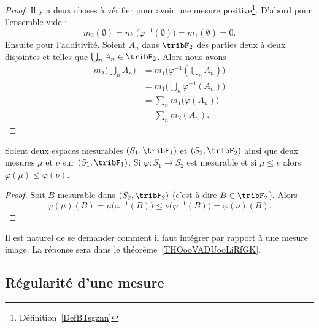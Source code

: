 \begin{proof}
	Il y a deux choses à vérifier pour avoir une mesure positive\footnote{Définition~\ref{DefBTsgznn}}. D'abord pour l'ensemble vide :
	\begin{equation}
		m_2(\emptyset)=m_1\big( \varphi^{-1}(\emptyset) \big)=m_1(\emptyset)=0.
	\end{equation}
	Ensuite pour l'additivité. Soient \( A_n\) dans \( \tribF_2\) des parties deux à deux disjointes et telles que \( \bigcup_nA_n\in\tribF_2\). Alors nous avons
	\begin{subequations}
		\begin{align}
			m_2\big( \bigcup_nA_n \big) & =m_1\Big( \varphi^{-1}(\bigcup_nA_n) \Big) \\
			                            & =m_1\big( \bigcup_n\varphi^{-1}(A_n) \big) \\
			                            & =\sum_nm_1\big( \varphi(A_n) \big)         \\
			                            & =\sum_nm_2(A_n).
		\end{align}
	\end{subequations}
\end{proof}

\begin{lemma}
	Soient deux espaces mesurables \( (S_1,\tribF_1)\) et \( (S_2,\tribF_2)\) ainsi que deux mesures \( \mu\) et \( \nu\) sur \( (S_1,\tribF_1)\). Si \( \varphi\colon S_1\to S_2\) est mesurable et si \( \mu\leq \nu\) alors \( \varphi(\mu)\leq \varphi(\nu)\).
\end{lemma}

\begin{proof}
	Soit \( B\) mesurable dans \( (S_2,\tribF_2)\) (c'est-à-dire \( B\in \tribF_2\)). Alors
	\begin{equation}
		\varphi(\mu)(B)=\mu\big( \varphi^{-1}(B) \big)\leq\nu\big( \varphi^{-1}(B) \big)=\varphi(\nu)(B).
	\end{equation}
\end{proof}

Il est naturel de se demander comment il faut intégrer par rapport à une mesure image. La réponse sera dans le théorème~\ref{THOooVADUooLiRfGK}.

\subsection{Régularité d'une mesure}

